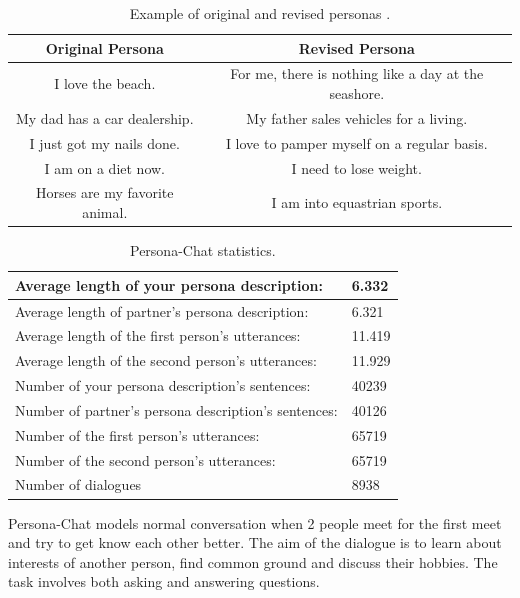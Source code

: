 \begin{table}[t]
\centering
  \begin{tabular}{ |c|c| } 
   \hline\hline
   \textbf{Original Persona} & \textbf{Revised Persona}  \\ 
   \hline\hline
   I love the beach. & For me, there is nothing like a day at the seashore. \\ 
   My dad has a car dealership. & My father sales vehicles for a living.  \\
   I just got my nails done. & I love to pamper myself on a regular basis. \\
   I am on a diet now. & I need to lose weight. \\
   Horses are my favorite animal. & I am into equastrian sports. \\ 
   \hline
  \end{tabular}
  \caption{Example of original and revised personas \cite{persona_chat}.}
\label{tab:persona_revised}
\end{table}

\begin{table}[t]
\centering
  \begin{tabular}{|p{8cm}|p{2cm}|} 
  \hline
  Average length of  your persona description: & 6.332 \\
  \hline
  Average length of partner's persona description: & 6.321 \\
  \hline
  Average length of the first person's utterances: & 11.419 \\
  \hline
  Average length of the second person's utterances: & 11.929 \\
  \hline
  Number of your persona description's sentences: & 40239 \\
  \hline
  Number of partner's  persona description's sentences: & 40126 \\
  \hline
  Number of the first person's utterances: & 65719 \\
  \hline
  Number of the second person's utterances:  & 65719 \\
  \hline
  Number of dialogues & 8938 \\
  \hline
  \end{tabular}
  \caption{Persona-Chat statistics.}
\label{tab:persona_chat_statistics}
\end{table}


Persona-Chat models normal conversation when 2 people meet for the first meet and try to get know each other better. The aim of the dialogue is to learn about interests of another person, find common ground and discuss their hobbies. The task involves both asking and answering questions. 

